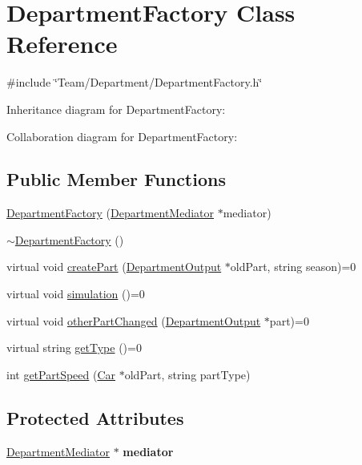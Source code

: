 \hypertarget{classDepartmentFactory}{}\section{Department\+Factory Class Reference}
\label{classDepartmentFactory}


{\ttfamily \#include \char`\"{}Team/\+Department/\+Department\+Factory.\+h\char`\"{}}



Inheritance diagram for Department\+Factory\+:


Collaboration diagram for Department\+Factory\+:
\subsection*{Public Member Functions}
\begin{DoxyCompactItemize}
\item 
\hyperlink{classDepartmentFactory_a94d9bd9fa828f2a04f3b89700007befe}{Department\+Factory} (\hyperlink{classDepartmentMediator}{Department\+Mediator} $\ast$mediator)
\item 
\hyperlink{classDepartmentFactory_a8792d28b10841f2f386d20dcda1c419c}{$\sim$\+Department\+Factory} ()
\item 
virtual void \hyperlink{classDepartmentFactory_a6080a560efb9fe0b9c870db5a7358886}{create\+Part} (\hyperlink{classDepartmentOutput}{Department\+Output} $\ast$old\+Part, string season)=0
\item 
virtual void \hyperlink{classDepartmentFactory_ad7360e63135822e44031053723ff95fc}{simulation} ()=0
\item 
virtual void \hyperlink{classDepartmentFactory_a41e5c96ee84f8237cb08d31cd782efae}{other\+Part\+Changed} (\hyperlink{classDepartmentOutput}{Department\+Output} $\ast$part)=0
\item 
virtual string \hyperlink{classDepartmentFactory_a5aac775b89c4c390ad885e1de8947b0d}{get\+Type} ()=0
\item 
int \hyperlink{classDepartmentFactory_a9a7fa0ea7860d17be0f3ef095d28a24e}{get\+Part\+Speed} (\hyperlink{classCar}{Car} $\ast$old\+Part, string part\+Type)
\end{DoxyCompactItemize}
\subsection*{Protected Attributes}
\begin{DoxyCompactItemize}
\item 
\mbox{\label{classDepartmentFactory_ae2ecaffebba359878b08a8c2d5a7bc12}} 
\hyperlink{classDepartmentMediator}{Department\+Mediator} $\ast$ {\bfseries mediator}
\end{DoxyCompactItemize}


